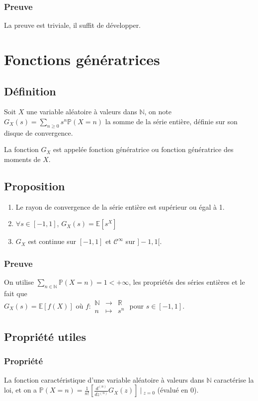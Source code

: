 \documentclass[a4paper,10pt]{book} %
\newcommand{\R}{\mathbb{R}}
\newcommand{\N}{\mathbb{N}}
\newcommand{\E}{\mathbb{E}} %
\renewcommand{\P}{\mathbb{P}} %
\newcommand{\tq}{~|~}
\begin{document}
\subsubsection{Preuve}
La preuve est triviale, il suffit de développer.

\newpage

\section{Fonctions génératrices}
\subsection{Définition}
Soit $X$ une variable aléatoire à valeurs dans $\N$, on note $G_X(s)=\sum_{n\geq 0}s^n\P(X=n)$ la somme de la série entière, définie sur son disque de convergence.

La fonction $G_X$ est appelée fonction génératrice ou fonction génératrice des moments de $X$.

\subsection{Proposition}
\begin{enumerate}
\item Le rayon de convergence de la série entière est supérieur ou égal à 1.
\item $\forall s\in [-1,1]$, $G_X(s)=\E[s^X]$
\item $G_X$ est continue sur $[-1,1]$ et $\mathcal{C}^\infty$ sur $]-1,1[$.
\end{enumerate}

\subsubsection{Preuve}
On utilise $\sum_{n\in\N}\P(X=n)=1<+\infty$, les propriétés des séries entières et le fait que \\
$G_X(s)= \E[f(X)]$ où $f : \begin{array}{rcl}\N&\rightarrow &\R \\ n&\mapsto&s^n\end{array}$ pour $s \in [-1,1]$.

\subsection{Propriété utiles}
\subsubsection{Propriété}
La fonction caractéristique d'une variable aléatoire à valeurs dans $\N$ caractérise la loi, et on a $\displaystyle \P(X=n)=\frac{1}{n!}\left[\frac{d^{(n)}}{dz^{(n)}}G_X(z) \right]\tq_{z=0}$ (évalué en 0).
\end{document}
